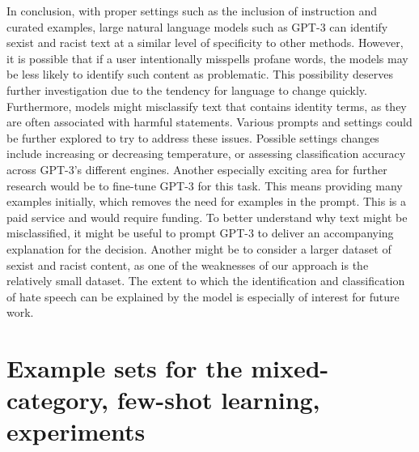 \documentclass[12pt,]{article}
\begin{document}
In conclusion, with proper settings such as the inclusion of instruction and curated examples, large natural language models such as GPT-3 can identify sexist and racist text at a similar level of specificity to other methods. However, it is possible that if a user intentionally misspells profane words, the models may be less likely to identify such content as problematic. This possibility deserves further investigation due to the tendency for language to change quickly. Furthermore, models might misclassify text that contains identity terms, as they are often associated with harmful statements. Various prompts and settings could be further explored to try to address these issues. Possible settings changes include increasing or decreasing temperature, or assessing classification accuracy across GPT-3's different engines. Another especially exciting area for further research would be to fine-tune GPT-3 for this task. This means providing many examples initially, which removes the need for examples in the prompt. This is a paid service and would require funding. To better understand why text might be misclassified, it might be useful to prompt GPT-3 to deliver an accompanying explanation for the decision. Another might be to consider a larger dataset of sexist and racist content, as one of the weaknesses of our approach is the relatively small dataset. The extent to which the identification and classification of hate speech can be explained by the model is especially of interest for future work.

\newpage

\appendix

\hypertarget{appendxa}{%
\section{Example sets for the mixed-category, few-shot learning, experiments}\label{appendxa}}
\end{document}
